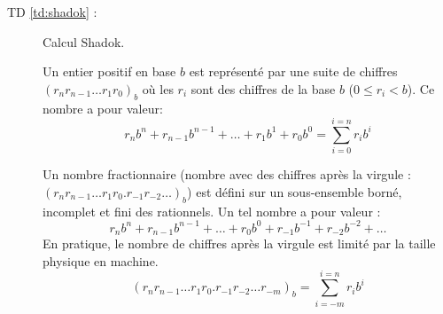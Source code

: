\begin{description}
\newpage	
\item[TD \ref{td:shadok} :] Calcul Shadok.

	\begin{rem}
	Un entier positif en base $b$ est représenté par une suite de
	chiffres {$(r_nr_{n-1}\ldots r_1r_0)_b$}
	où les $r_i$ sont des chiffres de la base $b$ ($0\leq r_i < b$).
	Ce nombre a pour valeur:
	$${r_nb^n + r_{n-1}b^{n-1} + \ldots + r_1b^1 + r_0b^0 = 
        \sum^{i=n}_{i = 0} r_ib^i}$$
	
	Un nombre fractionnaire (nombre avec des chiffres après la virgule :
	{$(r_nr_{n-1}\ldots r_1r_0.r_{-1}r_{-2}\ldots)_b$})
	est défini sur un sous-en\-semble borné, incomplet et fini des rationnels.
	Un tel nombre a pour valeur :
	$${r_nb^n + r_{n-1}b^{n-1} + \ldots + r_0b^0 + r_{-1}b^{-1} + r_{-2}b^{-2} + \ldots}$$
	En pratique, le nombre de chiffres après la virgule est limité par la taille physique
	en machine.
	$${(r_nr_{n-1}\ldots r_1r_0.r_{-1}r_{-2}\ldots r_{-m})_b = \sum_{i=-m}^{i=n} r_ib^i}$$
	\end{rem}
	

\end{description}
